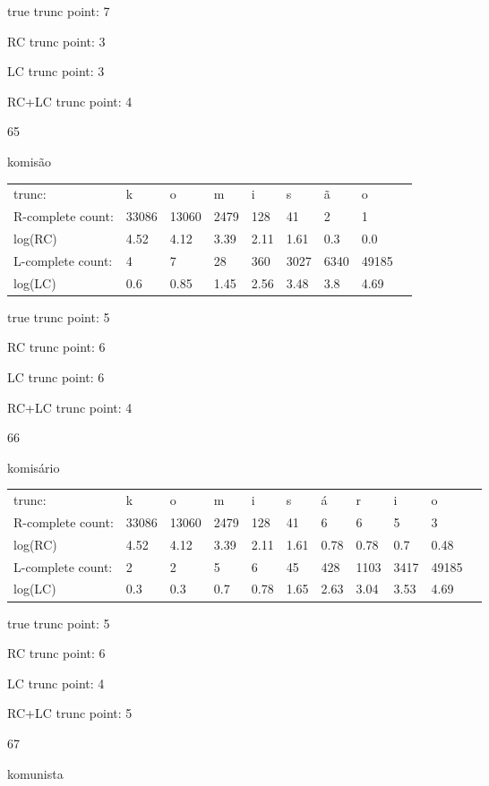 \documentclass{article}
\begin{document}
true trunc point: 7

RC trunc point: 3

LC trunc point: 3

RC+LC trunc point: 4

\newpage

65

komisão

\begin{tabular}{l|llllllll}
trunc: & k & o & m & i & s & ã & o & \\ 
R-complete count: & 33086 & 13060 & 2479 & 128 & 41 & 2 & 1 & \\ 
log(RC) & 4.52 & 4.12 & 3.39 & 2.11 & 1.61 & 0.3 & 0.0 & \\ 
L-complete count: & 4 & 7 & 28 & 360 & 3027 & 6340 & 49185 & \\ 
log(LC) & 0.6 & 0.85 & 1.45 & 2.56 & 3.48 & 3.8 & 4.69 & \\ 
\end{tabular}

true trunc point: 5

RC trunc point: 6

LC trunc point: 6

RC+LC trunc point: 4

\vspace{1em}

66

komisário

\begin{tabular}{l|llllllllll}
trunc: & k & o & m & i & s & á & r & i & o & \\ 
R-complete count: & 33086 & 13060 & 2479 & 128 & 41 & 6 & 6 & 5 & 3 & \\ 
log(RC) & 4.52 & 4.12 & 3.39 & 2.11 & 1.61 & 0.78 & 0.78 & 0.7 & 0.48 & \\ 
L-complete count: & 2 & 2 & 5 & 6 & 45 & 428 & 1103 & 3417 & 49185 & \\ 
log(LC) & 0.3 & 0.3 & 0.7 & 0.78 & 1.65 & 2.63 & 3.04 & 3.53 & 4.69 & \\ 
\end{tabular}

true trunc point: 5

RC trunc point: 6

LC trunc point: 4

RC+LC trunc point: 5

\vspace{1em}

67

komunista
\end{document}
